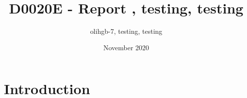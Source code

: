 \documentclass{article}
\title{D0020E - Report , testing, testing}
\author{olihgb-7, testing, testing }
\date{November 2020}
\begin{document}
\maketitle

\newpage

\section{Introduction}
\end{document}

